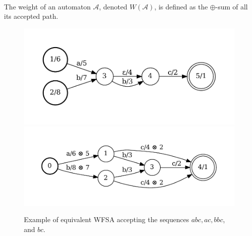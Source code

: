 \paragraph{} The weight of an automaton $\mathcal{A}$, denoted $W(\mathcal{A})$, is defined as the $\oplus$-sum of all its accepted path. 

%
\begin{figure}[t] %
    \centering 
        {\includegraphics[width=0.7\linewidth]{images/reg_fsa.pdf}}
        {\includegraphics[width=0.7\linewidth]{images/simple_fsa.pdf}}
    \caption{Example of equivalent WFSA accepting the sequences $abc, ac, bbc$, and $bc$.}
    \label{fig:standard_fsa}
\end{figure}